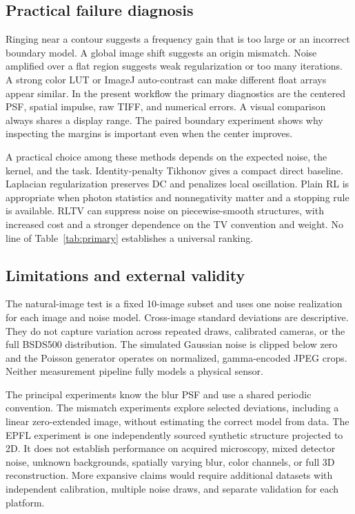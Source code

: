 \subsection{Practical failure diagnosis}

Ringing near a contour suggests a frequency gain that is too large or an incorrect boundary model. A global image shift suggests an origin mismatch. Noise amplified over a flat region suggests weak regularization or too many iterations. A strong color LUT or ImageJ auto-contrast can make different float arrays appear similar. In the present workflow the primary diagnostics are the centered PSF, spatial impulse, raw TIFF, and numerical errors. A visual comparison always shares a display range. The paired boundary experiment shows why inspecting the margins is important even when the center improves.

A practical choice among these methods depends on the expected noise, the kernel, and the task. Identity-penalty Tikhonov gives a compact direct baseline. Laplacian regularization preserves DC and penalizes local oscillation. Plain RL is appropriate when photon statistics and nonnegativity matter and a stopping rule is available. RLTV can suppress noise on piecewise-smooth structures, with increased cost and a stronger dependence on the TV convention and weight. No line of Table~\ref{tab:primary} establishes a universal ranking.

\subsection{Limitations and external validity}

The natural-image test is a fixed 10-image subset and uses one noise realization for each image and noise model. Cross-image standard deviations are descriptive. They do not capture variation across repeated draws, calibrated cameras, or the full BSDS500 distribution. The simulated Gaussian noise is clipped below zero and the Poisson generator operates on normalized, gamma-encoded JPEG crops. Neither measurement pipeline fully models a physical sensor.

The principal experiments know the blur PSF and use a shared periodic convention. The mismatch experiments explore selected deviations, including a linear zero-extended image, without estimating the correct model from data. The EPFL experiment is one independently sourced synthetic structure projected to 2D. It does not establish performance on acquired microscopy, mixed detector noise, unknown backgrounds, spatially varying blur, color channels, or full 3D reconstruction. More expansive claims would require additional datasets with independent calibration, multiple noise draws, and separate validation for each platform.

